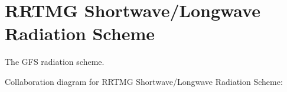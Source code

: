\section{R\+R\+T\+MG Shortwave/\+Longwave Radiation Scheme}
\label{group__rad}


The G\+FS radiation scheme.  


Collaboration diagram for R\+R\+T\+MG Shortwave/\+Longwave Radiation Scheme\+:
